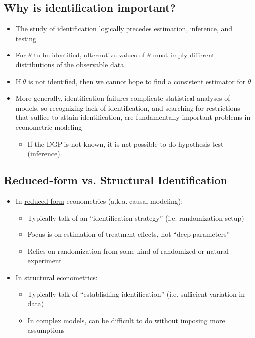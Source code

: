 \documentclass[11pt]{article}
\begin{document}
\subsection{Why is identification important?}
\label{sec:org0129c47}

\begin{itemize}
\item The study of identification logically precedes estimation, inference, and testing
\item For \(\theta\) to be identified, alternative values of \(\theta\) must imply different distributions of the observable data
\item If \(\theta\) is not identified, then we cannot hope to find a consistent estimator for \(\theta\)
\item More generally, identification failures complicate statistical analyses of models, so recognizing lack of identification, and searching for restrictions that suffice to attain identification, are fundamentally important problems in econometric modeling
\begin{itemize}
\item If the DGP is not known, it is not possible to do hypothesis test (inference)
\end{itemize}
\end{itemize}

\subsection{Reduced-form vs. Structural Identification}
\label{sec:org51e27c1}

\begin{itemize}
\item In \uline{reduced-form} econometrics (a.k.a. causal modeling):
\begin{itemize}
\item Typically talk of an ``identification strategy'' (i.e. randomization setup)
\item Focus is on estimation of treatment effects, not ``deep parameters''
\item Relies on randomization from some kind of randomized or natural experiment
\end{itemize}

\item In \uline{structural econometrics}:

\begin{itemize}
\item Typically talk of ``establishing identification'' (i.e. sufficient variation in data)
\item In complex models, can be difficult to do without imposing more assumptions
\end{itemize}
\end{itemize}
\end{document}
